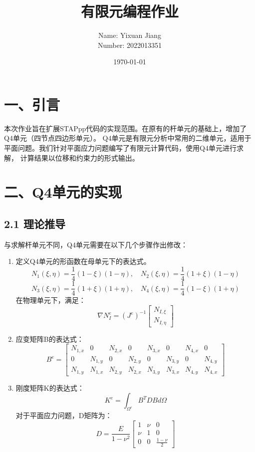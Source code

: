 \documentclass[12pt]{article}
\title{有限元编程作业}
\author{Name: Yixuan Jiang \\ Number: 2022013351}
\date{\today}
\begin{document}
\maketitle
\section*{一、引言}
本次作业旨在扩展STAPpp代码的实现范围。在原有的杆单元的基础上，增加了Q4单元（四节点四边形单元）。
Q4单元是有限元分析中常用的二维单元，适用于平面问题。我们针对平面应力问题编写了有限元计算代码，使用Q4单元进行求解，
计算结果以位移和约束力的形式输出。
\section*{二、Q4单元的实现}
\subsection*{2.1 理论推导}
与求解杆单元不同，Q4单元需要在以下几个步骤作出修改：
\begin{enumerate}
    \item 定义Q4单元的形函数在母单元下的表达式。
    \begin{equation}
        N_1(\xi, \eta) = \frac{1}{4}(1 - \xi)(1 - \eta), \quad N_2(\xi, \eta) = \frac{1}{4}(1 + \xi)(1 - \eta)
    \end{equation}
    \begin{equation}
        N_3(\xi, \eta) = \frac{1}{4}(1 + \xi)(1 + \eta), \quad N_4(\xi, \eta) = \frac{1}{4}(1 - \xi)(1 + \eta)
    \end{equation}
    在物理单元下，满足：
    \begin{equation}
        \nabla N_I^e = (J^{e})^{-1}\begin{bmatrix}N_{I,\xi}\\N_{I,\eta}
        \end{bmatrix}
    \end{equation}
    \item 应变矩阵B的表达式：
    \begin{equation}
        B^e=\begin{bmatrix}N_{1,x} &0 & N_{2,x} & 0 & N_{3,x} & 0 & N_{4,x} & 0\\
        0 & N_{1,y} & 0 & N_{2,y} & 0 & N_{3,y} & 0 & N_{4,y}\\
        N_{1,y} & N_{1,x} & N_{2,y} & N_{2,x} & N_{3,y} & N_{3,x} & N_{4,y} & N_{4,x}
        \end{bmatrix}
    \end{equation}
    \item 刚度矩阵K的表达式：
    \begin{equation}
        K^e = \int_{\Omega^e} B^T D B d\Omega
    \end{equation}
    对于平面应力问题，D矩阵为：
    \begin{equation}
        D = \frac{E}{1 - \nu^2}\begin{bmatrix}1 & \nu & 0\\
        \nu & 1 & 0\\
        0 & 0 & \frac{1 - \nu}{2}\end{bmatrix}
    \end{equation}
\end{enumerate}
\end{document}
